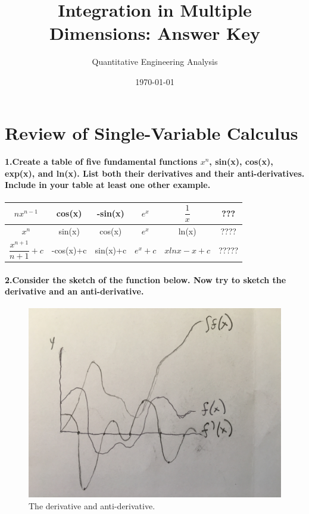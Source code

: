 \documentclass{article}
\title{Integration in Multiple Dimensions: Answer Key}
\author{Quantitative Engineering Analysis}
\date{\today}
\begin{document}
\maketitle

\section{Review of Single-Variable Calculus}

\paragraph{1.Create a table of five fundamental functions $x^n$, sin(x), cos(x), exp(x), and ln(x). List both their derivatives and their anti-derivatives. Include in your table at least one other example.}


\begin{center}
\begin{tabular}{ |c|c|c|c|c|c| }
\hline
 $nx^{n-1}$ & cos(x) & -sin(x) & $e^x$ & $\dfrac{1}{x}$ & ??? \\ \hline \hline
 $x^n$ & sin(x) & cos(x) & $e^x$ & ln(x) & ???? \\ \hline \hline 
 $\dfrac{x^{n+1}}{n+1}+c$ & -cos(x)+c & sin(x)+c & $e^x+c$ & $xlnx-x+c$ & ????? \\ \hline
\end{tabular}
\end{center}


\paragraph{2.Consider the sketch of the function below. Now try to sketch the derivative and an anti-derivative.}

\begin{figure}[H]
    \centering
    \includegraphics[width=0.5\columnwidth]{sketch.jpg}
    \caption{The derivative and anti-derivative.}
\end{figure}
\end{document}

